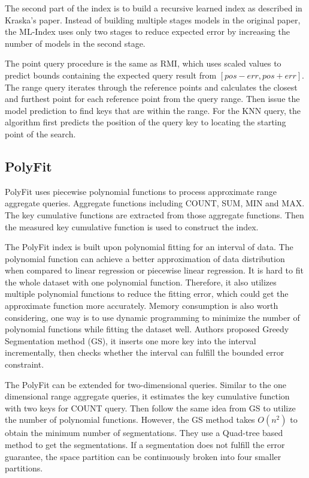 The second part of the index is to build a recursive learned index as described in Kraska's paper. Instead of building multiple stages models in the original paper, the ML-Index uses only two stages to reduce expected error by increasing the number of models in the second stage. 

The point query procedure is the same as RMI, which uses scaled values to predict bounds containing the expected query result from $[pos - err, pos + err]$. The range query iterates through the reference points and calculates the closest and furthest point for each reference point from the query range. Then issue the model prediction to find keys that are within the range. For the KNN query, the algorithm first predicts the position of the query key to locating the starting point of the search. 


\subsection{PolyFit}
PolyFit \cite{li2020polyfit} uses piecewise polynomial functions to process approximate range aggregate queries. Aggregate functions including COUNT, SUM, MIN and MAX. The key cumulative functions are extracted from those aggregate functions. Then the measured key cumulative function is used to construct the index. 

The PolyFit index is built upon polynomial fitting for an interval of data. The polynomial function can achieve a better approximation of data distribution when compared to linear regression or piecewise linear regression. It is hard to fit the whole dataset with one polynomial function. Therefore, it also utilizes multiple polynomial functions to reduce the fitting error, which could get the approximate function more accurately. Memory consumption is also worth considering, one way is to use dynamic programming to minimize the number of polynomial functions while fitting the dataset well. Authors proposed Greedy Segmentation method (GS), it inserts one more key into the interval incrementally, then checks whether the interval can fulfill the bounded error constraint. 

The PolyFit can be extended for two-dimensional queries. Similar to the one dimensional range aggregate queries, it estimates the key cumulative function with two keys for COUNT query. Then follow the same idea from GS to utilize the number of polynomial functions. However, the GS method takes $O(n^2)$ to obtain the minimum number of segmentations. They use a Quad-tree based method to get the segmentations. If a segmentation does not fulfill the error guarantee, the space partition can be continuously broken into four smaller partitions. 



